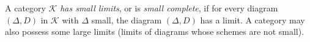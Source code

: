 A category $\mathcal{K}$ \emph{has small limits}, or is \emph{small complete}, if for every diagram $(\Delta, D)$ in $\mathcal{K}$ with $\Delta$ small, the diagram $(\Delta, D)$ has a limit. A category may also possess some large limits (limits of diagrams whose schemes are not small).
